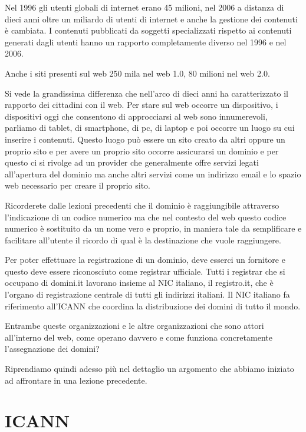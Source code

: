 Nel 1996 gli utenti globali di internet erano 45 milioni, nel 2006 a distanza di dieci anni oltre un miliardo di utenti di internet e anche la gestione dei contenuti è cambiata. I contenuti pubblicati da soggetti specializzati rispetto ai contenuti generati dagli utenti hanno un rapporto completamente diverso nel 1996 e nel 2006. 

Anche i siti presenti sul web 250 mila nel web 1.0, 80 milioni nel web 2.0. 

Si vede la grandissima differenza che nell'arco di dieci anni ha caratterizzato il rapporto dei cittadini con il web.
Per stare sul web occorre un dispositivo, i dispositivi oggi che consentono di approcciarsi al web sono innumerevoli, parliamo di tablet, di smartphone, di pc, di laptop e poi occorre un luogo su cui inserire i contenuti. Questo luogo può essere un sito creato da altri oppure un proprio sito e per avere un proprio sito occorre assicurarsi un dominio e per questo ci si rivolge ad un provider che generalmente offre servizi legati all'apertura del dominio ma anche altri servizi come un indirizzo email e lo spazio web necessario per creare il proprio sito.

Ricorderete dalle lezioni precedenti che il dominio è raggiungibile attraverso l'indicazione di un codice numerico ma che nel contesto del web questo codice numerico è sostituito da un nome vero e proprio, in maniera tale da semplificare e facilitare all'utente il ricordo di qual è la destinazione che vuole raggiungere.

Per poter effettuare la registrazione di un dominio, deve esserci un fornitore e questo deve essere riconosciuto come registrar ufficiale. Tutti i registrar che si occupano di domini.it lavorano insieme al NIC italiano, il registro.it, che è l'organo di registrazione centrale di tutti gli indirizzi italiani. Il NIC italiano fa riferimento all'ICANN che coordina la distribuzione dei domini di tutto il mondo.

Entrambe queste organizzazioni e le altre organizzazioni che sono attori all'interno del web, come operano davvero e come funziona concretamente l'assegnazione dei domini?

Riprendiamo quindi adesso più nel dettaglio un argomento che abbiamo iniziato ad affrontare in una lezione precedente.\par

\section{ICANN}

